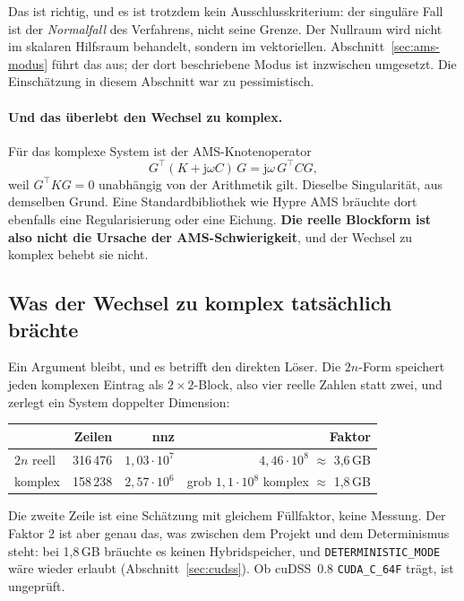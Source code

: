 \documentclass[11pt,a4paper]{article}
\begin{document}
Das ist richtig, und es ist trotzdem kein Ausschlusskriterium: der singuläre
Fall ist der \emph{Normalfall} des Verfahrens, nicht seine Grenze. Der Nullraum
wird nicht im skalaren Hilfsraum behandelt, sondern im vektoriellen.
Abschnitt~\ref{sec:ams-modus} führt das aus; der dort beschriebene Modus ist
inzwischen umgesetzt. Die Einschätzung in diesem Abschnitt war zu pessimistisch.

\paragraph{Und das überlebt den Wechsel zu komplex.} Für das komplexe System
ist der AMS-Knotenoperator
\begin{equation}
  G^{\!\top}(K + \mathrm{j}\omega C)\,G = \mathrm{j}\omega\,G^{\!\top}CG,
\end{equation}
weil $G^{\!\top}KG = 0$ unabhängig von der Arithmetik gilt. Dieselbe
Singularität, aus demselben Grund. Eine Standardbibliothek wie Hypre AMS
bräuchte dort ebenfalls eine Regularisierung oder eine Eichung. \textbf{Die
reelle Blockform ist also nicht die Ursache der AMS-Schwierigkeit}, und der
Wechsel zu komplex behebt sie nicht.

\subsection{Was der Wechsel zu komplex tatsächlich brächte}

Ein Argument bleibt, und es betrifft den direkten Löser. Die $2n$-Form
speichert jeden komplexen Eintrag als $2\times2$-Block, also vier reelle
Zahlen statt zwei, und zerlegt ein System doppelter Dimension:

\begin{center}
\begin{tabular}{lrrr}
\toprule
 & Zeilen & nnz & Faktor \\
\midrule
$2n$ reell & 316\,476 & $1{,}03\cdot10^{7}$ & $4{,}46\cdot10^{8}$ $\approx$ 3,6\,GB \\
komplex    & 158\,238 & $2{,}57\cdot10^{6}$ & grob $1{,}1\cdot10^{8}$ komplex $\approx$ 1,8\,GB \\
\bottomrule
\end{tabular}
\end{center}

Die zweite Zeile ist eine Schätzung mit gleichem Füllfaktor, keine Messung.
Der Faktor 2 ist aber genau das, was zwischen dem Projekt und dem
Determinismus steht: bei 1,8\,GB bräuchte es keinen Hybridspeicher, und
\texttt{DETERMINISTIC\_MODE} wäre wieder erlaubt (Abschnitt~\ref{sec:cudss}).
Ob cuDSS~0.8 \texttt{CUDA\_C\_64F} trägt, ist ungeprüft.
\end{document}
